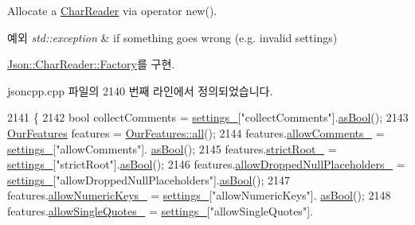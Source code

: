 Allocate a \hyperlink{class_json_1_1_char_reader}{Char\+Reader} via operator new(). 


\begin{DoxyExceptions}{예외}
{\em std\+::exception} & if something goes wrong (e.\+g. invalid settings) \\
\hline
\end{DoxyExceptions}


\hyperlink{class_json_1_1_char_reader_1_1_factory_a4c5862a1ffd432372dbe65cf59de98c4}{Json\+::\+Char\+Reader\+::\+Factory}를 구현.



jsoncpp.\+cpp 파일의 2140 번째 라인에서 정의되었습니다.


\begin{DoxyCode}
2141 \{
2142   \textcolor{keywordtype}{bool} collectComments = \hyperlink{class_json_1_1_char_reader_builder_ac69b7911ad64c171c51ebaf2ea26d958}{settings\_}[\textcolor{stringliteral}{"collectComments"}].\hyperlink{class_json_1_1_value_ab693fb7b9b1595bb0adc49658bbf780d}{asBool}();
2143   \hyperlink{class_json_1_1_our_features}{OurFeatures} features = \hyperlink{class_json_1_1_our_features_a0686e1406b6677f496529f9f3fe98d1e}{OurFeatures::all}();
2144   features.\hyperlink{class_json_1_1_our_features_ac71bb7ba7363d3b05ed76602b036ce33}{allowComments\_} = \hyperlink{class_json_1_1_char_reader_builder_ac69b7911ad64c171c51ebaf2ea26d958}{settings\_}[\textcolor{stringliteral}{"allowComments"}].
      \hyperlink{class_json_1_1_value_ab693fb7b9b1595bb0adc49658bbf780d}{asBool}();
2145   features.\hyperlink{class_json_1_1_our_features_a2095f66a776c0a4ae6cc931a0c94242e}{strictRoot\_} = \hyperlink{class_json_1_1_char_reader_builder_ac69b7911ad64c171c51ebaf2ea26d958}{settings\_}[\textcolor{stringliteral}{"strictRoot"}].\hyperlink{class_json_1_1_value_ab693fb7b9b1595bb0adc49658bbf780d}{asBool}();
2146   features.\hyperlink{class_json_1_1_our_features_a13963bc44bf948eec1968f7ff8e8f5f1}{allowDroppedNullPlaceholders\_} = 
      \hyperlink{class_json_1_1_char_reader_builder_ac69b7911ad64c171c51ebaf2ea26d958}{settings\_}[\textcolor{stringliteral}{"allowDroppedNullPlaceholders"}].\hyperlink{class_json_1_1_value_ab693fb7b9b1595bb0adc49658bbf780d}{asBool}();
2147   features.\hyperlink{class_json_1_1_our_features_af6973fc7e774ce2d634ba99442aeb91a}{allowNumericKeys\_} = \hyperlink{class_json_1_1_char_reader_builder_ac69b7911ad64c171c51ebaf2ea26d958}{settings\_}[\textcolor{stringliteral}{"allowNumericKeys"}].
      \hyperlink{class_json_1_1_value_ab693fb7b9b1595bb0adc49658bbf780d}{asBool}();
2148   features.\hyperlink{class_json_1_1_our_features_abbd6c196d7a22e2a360a59887eda4610}{allowSingleQuotes\_} = \hyperlink{class_json_1_1_char_reader_builder_ac69b7911ad64c171c51ebaf2ea26d958}{settings\_}[\textcolor{stringliteral}{"allowSingleQuotes"}].

\end{DoxyCode}
